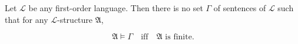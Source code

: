 Let $\mathcal{L}$ be any first-order language. Then there is no set $\Gamma$ of sentences of $\mathcal{L}$ such that for any $\mathcal{L}$-structure $\mathfrak{A}$,

$$\mathfrak{A} \models \Gamma \quad\text{iff}\quad \mathfrak{A} \text{ is finite}.$$
